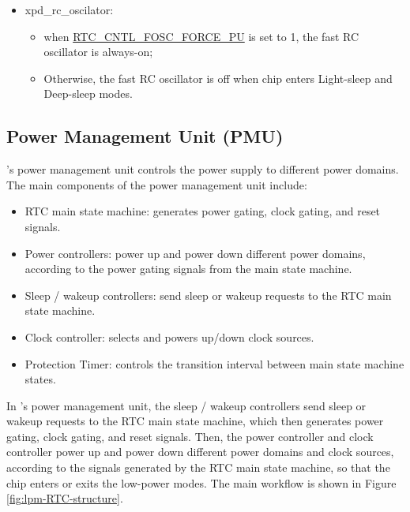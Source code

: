 \documentclass[main\_\_EN.tex]{subfiles}
\begin{document}
\begin{tiplisting}
\begin{itemize}
\begin{itemize}
\begin{itemize}
        \end{itemize}
        \item xpd\_rc\_oscilator: 
        \begin{itemize}
            \item when \hyperref[fielddesc:RTCCNTLFOSCFORCEPU]{RTC\_CNTL\_FOSC\_FORCE\_PU} is set to 1, the fast RC oscillator is always-on;
            \item Otherwise, the fast RC oscillator is off when chip enters Light-sleep and Deep-sleep modes.
        \end{itemize}
    \end{itemize}
\end{itemize} 
\end{tiplisting}




\subsection{Power Management Unit (PMU)}

\chipname{}'s power management unit controls the power supply to different power domains. The main components of the power management unit include:

\begin{itemize}
    \item RTC main state machine: generates power gating, clock gating, and reset signals.
    \item Power controllers: power up and power down different power domains, according to the power gating signals from the main state machine.
    \item Sleep / wakeup controllers: send sleep or wakeup requests to the RTC main state machine.
    \item Clock controller: selects and powers up/down clock sources.
    \item Protection Timer: controls the transition interval between main state machine states.
\end{itemize}
In \chipname{}'s power management unit, the sleep / wakeup controllers send sleep or wakeup requests to the RTC main state machine, which then generates power gating, clock gating, and reset signals. Then, the power controller and clock controller power up and power down different power domains and clock sources, according to the signals generated by the RTC main state machine, so that the chip enters or exits the low-power modes. The main workflow is shown in Figure \ref{fig:lpm-RTC-structure}.
\end{document}
